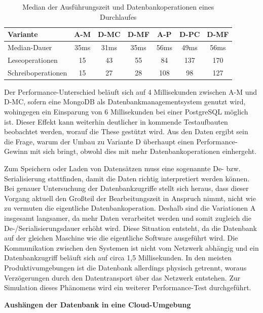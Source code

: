 \begin{table}
	\centering
	\begin{tabular}{ | >{\raggedright\arraybackslash}m{} || c | c | c | c | c | c | } 
		\hline
		Variante & A-M & D-MC & D-MF & A-P & D-PC & D-MF \\ 
		\hline
		Median-Dauer & 35ms & 31ms & 35ms & 56ms & 49ms & 56ms \\
		\hline
		Leseoperationen & 15 & 43 &  55 &  84 & 137 & 170 \\
		\hline
		Schreiboperationen & 15 & 27 & 28 & 108 & 98 & 127 \\
		\hline
	\end{tabular}
	\caption{Median der Ausführungszeit und Datenbankoperationen eines Durchlaufes}
	\label{fig:durationofexecution}
\end{table}

Der Performance-Unterschied beläuft sich auf 4 Millisekunden zwischen A-M und D-MC, sofern eine MongoDB als Datenbankmanagementsystem genutzt wird, wohingegen ein Einsparung von 6 Millisekunden bei einer PostgreSQL möglich ist. Dieser Effekt kann weiterhin deutlicher in kommende Testaufbauten beobachtet werden, worauf die These gestützt wird. Aus den Daten ergibt sein die Frage, warum der Umbau zu Variante D überhaupt einen Performance-Gewinn mit sich bringt, obwohl dies mit mehr Datenbankoperationen einhergeht. 

Zum Speichern oder Laden von Datensätzen muss eine sogenannte De- bzw. Serialisierung stattfinden, damit die Daten richtig interpretiert werden können. Bei genauer Untersuchung der Datenbankzugriffe stellt sich heraus, dass dieser Vorgang aktuell den Großteil der Bearbeitungszeit in Anspruch nimmt, nicht wie zu vermuten die eigentliche Datenbankoperation. Deshalb sind die Variationen A insgesamt langsamer, da mehr Daten verarbeitet werden und somit zugleich die De-/Serialisierungsdauer erhöht wird. Diese Situation entsteht, da die Datenbank auf der gleichen Maschine wie die eigentliche Software ausgeführt wird. Die Kommunikation zwischen den Systemen ist nicht vom Netzwerk abhängig und ein Datenbankzugriff beläuft sich auf circa 1,5 Millisekunden. In den meisten Produktivumgebungen ist die Datenbank allerdings physisch getrennt, woraus Verzögerungen durch den Datentransport über das Netzwerk entstehen. Zur Simulation dieses Phänomens wird ein weiterer Performance-Test durchgeführt. 

\textbf{Aushängen der Datenbank in eine Cloud-Umgebung}

